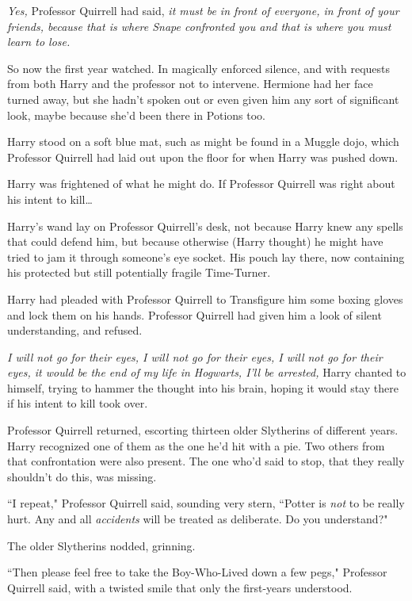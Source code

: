 \later

\emph{Yes,} Professor Quirrell had said, \emph{it must be in front of everyone, in front of your friends, because that is where Snape confronted you and that is where you must learn to lose.}

So now the first year watched. In magically enforced silence, and with requests from both Harry and the professor not to intervene. Hermione had her face turned away, but she hadn't spoken out or even given him any sort of significant look, maybe because she'd been there in Potions too.

Harry stood on a soft blue mat, such as might be found in a Muggle dojo, which Professor Quirrell had laid out upon the floor for when Harry was pushed down.

Harry was frightened of what he might do. If Professor Quirrell was right about his intent to kill{\ldots}

Harry's wand lay on Professor Quirrell's desk, not because Harry knew any spells that could defend him, but because otherwise (Harry thought) he might have tried to jam it through someone's eye socket. His pouch lay there, now containing his protected but still potentially fragile Time-Turner.

Harry had pleaded with Professor Quirrell to Transfigure him some boxing gloves and lock them on his hands. Professor Quirrell had given him a look of silent understanding, and refused.

\emph{I will not go for their eyes, I will not go for their eyes, I will not go for their eyes, it would be the end of my life in Hogwarts, I'll be arrested,} Harry chanted to himself, trying to hammer the thought into his brain, hoping it would stay there if his intent to kill took over.

Professor Quirrell returned, escorting thirteen older Slytherins of different years. Harry recognized one of them as the one he'd hit with a pie. Two others from that confrontation were also present. The one who'd said to stop, that they really shouldn't do this, was missing.

``I repeat," Professor Quirrell said, sounding very stern, ``Potter is \emph{not} to be really hurt. Any and all \emph{accidents} will be treated as deliberate. Do you understand?"

The older Slytherins nodded, grinning.

``Then please feel free to take the Boy-Who-Lived down a few pegs," Professor Quirrell said, with a twisted smile that only the first-years understood.

